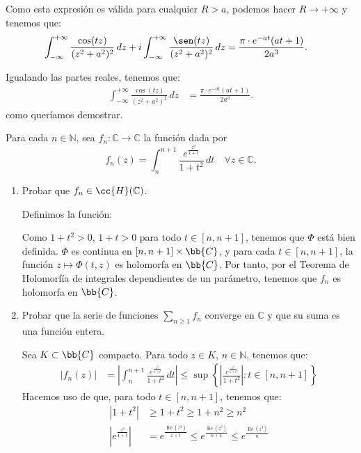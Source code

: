 \documentclass[12pt]{article}
\renewcommand{\Re}{\operatorname{Re}} %
\begin{document}
\begin{ejercicio}[2.5 puntos]
    Como esta expresión es válida para cualquier $R > a$, podemos hacer $R \to +\infty$ y tenemos que:
    \begin{align*}
        \int_{-\infty}^{+\infty} \frac{\cos(t z)}{(z^2 + a^2)^2} \, dz + i\int_{-\infty}^{+\infty} \frac{\sen(t z)}{(z^2 + a^2)^2} \, dz &= \frac{\pi\cdot e^{-at}(at + 1)}{2a^3}.
    \end{align*}

    Igualando las partes reales, tenemos que:
    \begin{align*}
        \int_{-\infty}^{+\infty} \frac{\cos(t z)}{(z^2 + a^2)^2} \, dz &= \frac{\pi\cdot e^{-at}(at + 1)}{2a^3}.
    \end{align*}
    como queríamos demostrar.
    \end{ejercicio}

    \begin{ejercicio}[2.5 puntos]
        Para cada $n \in \mathbb{N}$, sea $f_n : \mathbb{C} \to \mathbb{C}$ la función dada por
        \[
            f_n(z) = \int_n^{n+1} \frac{e^{\frac{z^3}{1+t}}}{1 + t^2} \, dt \quad \forall z \in \mathbb{C}.
        \]
        \begin{enumerate}
            \item Probar que $f_n \in \cc{H}(\mathbb{C})$.
            
            Definimos la función:

            Como $1 + t^2 > 0$, $1+t> 0$ para todo $t\in [n, n+1]$, tenemos que $\Phi$ está bien definida. $\Phi$ es continua en $[n, n+1]\times \bb{C}$, y para cada $t\in [n, n+1]$, la función $z\mapsto \Phi(t, z)$ es holomorfa en $\bb{C}$. Por tanto, por el Teorema de Holomorfía de integrales dependientes de un parámetro, tenemos que $f_n$ es holomorfa en $\bb{C}$.
            \item Probar que la serie de funciones $\sum\limits_{n\geq 1} f_n$ converge en $\mathbb{C}$ y que su suma es una función entera.
            
            Sea $K\subset \bb{C}$ compacto. Para todo $z\in K$, $n\in \mathbb{N}$, tenemos que:
            \begin{align*}
                |f_n(z)| &= \left|\int_n^{n+1} \frac{e^{\frac{z^3}{1+t}}}{1 + t^2} \, dt\right|
                \leq \sup\left\{\left|\frac{e^{\frac{z^3}{1+t}}}{1 + t^2}\right| : t\in [n, n+1]\right\}
            \end{align*}
            Hacemos uso de que, para todo $t\in [n, n+1]$, tenemos que:
            \begin{align*}
                |1+ t^2| &\geq 1+t^2\geq 1+n^2\geq n^2\\
                \left|e^{\frac{z^3}{1+t}}\right| &= e^{\frac{\Re(z^3)}{1+t}} \leq
                e^{\frac{\Re(z^3)}{n+1}}
                \leq e^{\frac{\Re(z^3)}{n}}
            \end{align*}


\end{enumerate}
\end{ejercicio}
\end{document}
